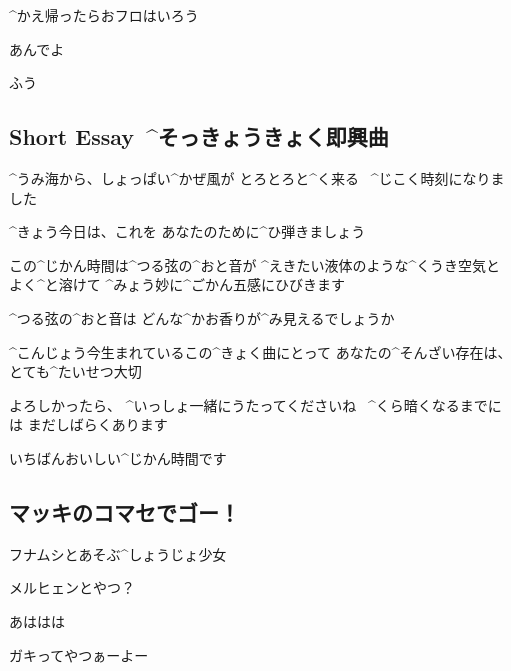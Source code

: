 \Makki ^{かえ}{帰}ったらおフロはいろう

\Takahiro あんでよ

\Alpha ふう


\subsection{Short Essay\ ^{そっきょうきょく}{即興曲}}

\page[127]
\Alpha ^{うみ}{海}から、しょっぱい^{かぜ}{風}が
とろとろと^{く}{来}る
\ ^{じこく}{時刻}になりました

\Alpha ^{きょう}{今日}は、これを
あなたのために^{ひ}{弾}きましょう

\page
\Alpha この^{じかん}{時間}は^{つる}{弦}の^{おと}{音}が
^{えきたい}{液体}のような^{くうき}{空気}とよく^{と}{溶}けて
^{みょう}{妙}に^{ごかん}{五感}にひびきます

\page
\Alpha ^{つる}{弦}の^{おと}{音}は
どんな^{かお}{香}りが^{み}{見}えるでしょうか

\Alpha ^{こんじょう}{今生}まれているこの^{きょく}{曲}にとって
あなたの^{そんざい}{存在}は、とても^{たいせつ}{大切}

\page
\Alpha よろしかったら、
^{いっしょ}{一緒}にうたってくださいね
\ ^{くら}{暗}くなるまでには
まだしばらくあります

\Alpha いちばんおいしい^{じかん}{時間}です


\subsection{マッキのコマセでゴー！}
\Ayase フナムシとあそぶ^{しょうじょ}{少女}

\Ayase メルヒェンとやつ？

\Makki あははは

\Ayase ガキってやつぁーよー
